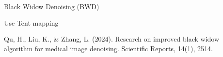 Black Widow Denoising (BWD)

Use Tent mapping

Qu, H., Liu, K., & Zhang, L. (2024). Research on improved black widow algorithm for medical image denoising. Scientific Reports, 14(1), 2514.

